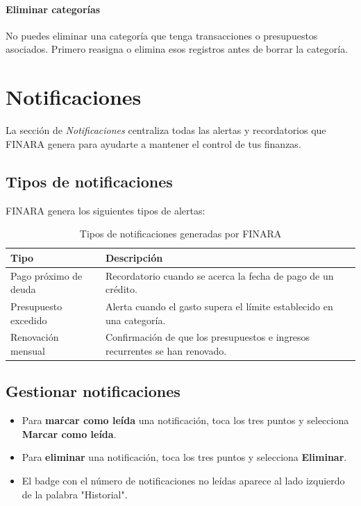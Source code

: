 \documentclass[a4paper,12pt]{report}
\newcommand{\pantalla}[1]{\textit{\textcolor{gristexto}{#1}}}
\begin{document}
\subsubsection*{Eliminar categorías}

No puedes eliminar una categoría que tenga transacciones o presupuestos
asociados. Primero reasigna o elimina esos registros antes de borrar la
categoría.


\chapter{Notificaciones}

La sección de \pantalla{Notificaciones} centraliza todas las alertas y
recordatorios que FINARA genera para ayudarte a mantener el control de
tus finanzas.

\section{Tipos de notificaciones}

FINARA genera los siguientes tipos de alertas:

\begin{table}[H]
  \centering
  \caption{Tipos de notificaciones generadas por FINARA}
  \label{tab:notificaciones}
  \begin{tabular}{lp{9cm}}
    \toprule
    \textbf{Tipo} & \textbf{Descripción} \\
    \midrule
    Pago próximo de deuda &
      Recordatorio cuando se acerca la fecha de pago de un crédito. \\
    Presupuesto excedido &
      Alerta cuando el gasto supera el límite establecido en una
      categoría. \\
    Renovación mensual &
      Confirmación de que los presupuestos e ingresos recurrentes se
      han renovado. \\
    \bottomrule
  \end{tabular}
\end{table}

\section{Gestionar notificaciones}

\begin{itemize}
  \item Para \textbf{marcar como leída} una notificación, toca los tres puntos y selecciona \textbf{Marcar como leída}.
  \item Para \textbf{eliminar} una notificación, toca los tres puntos y selecciona \textbf{Eliminar}.
  \item El badge con el número de notificaciones no leídas aparece al lado izquierdo de la palabra "Historial".
\end{itemize}
\end{document}
